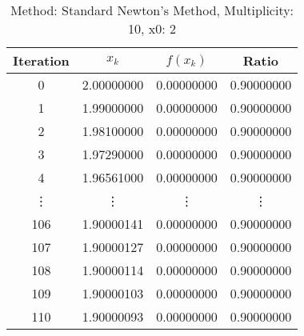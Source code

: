 \begin{table}
\centering
\caption{Method: Standard Newton's Method, Multiplicity: 10, x0: 2}
\label{tab:table_Standard_Newton's_Method_10_2}
\begin{tabular}{c c c c}
\toprule
Iteration &      $x_k$ &   $f(x_k)$ &      Ratio \\
\midrule
        0 & 2.00000000 & 0.00000000 & 0.90000000 \\
        1 & 1.99000000 & 0.00000000 & 0.90000000 \\
        2 & 1.98100000 & 0.00000000 & 0.90000000 \\
        3 & 1.97290000 & 0.00000000 & 0.90000000 \\
        4 & 1.96561000 & 0.00000000 & 0.90000000 \\
   \vdots &     \vdots &     \vdots &     \vdots \\
      106 & 1.90000141 & 0.00000000 & 0.90000000 \\
      107 & 1.90000127 & 0.00000000 & 0.90000000 \\
      108 & 1.90000114 & 0.00000000 & 0.90000000 \\
      109 & 1.90000103 & 0.00000000 & 0.90000000 \\
      110 & 1.90000093 & 0.00000000 & 0.90000000 \\
\bottomrule
\end{tabular}
\end{table}
